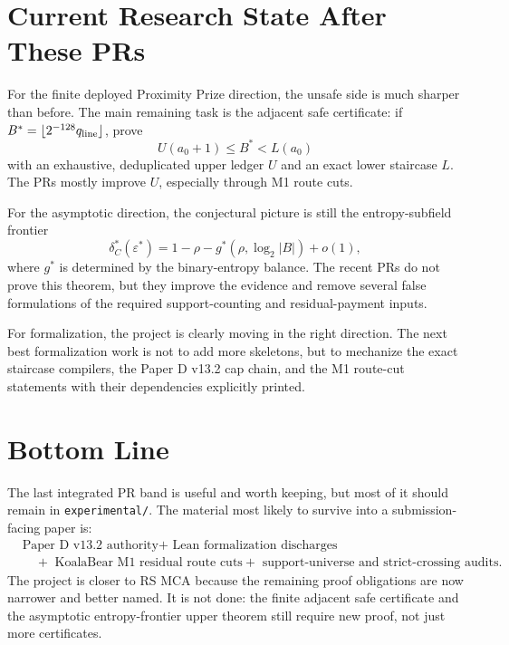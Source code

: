 \documentclass[a4paper,11pt]{amsart}
\begin{document}
\section{Current Research State After These PRs}

For the finite deployed Proximity Prize direction, the unsafe side is much
sharper than before.  The main remaining task is the adjacent safe certificate:
if \(B^*=\lfloor 2^{-128}q_{\rm line}\rfloor\), prove
\[
        U(a_0+1)\le B^* < L(a_0)
\]
with an exhaustive, deduplicated upper ledger \(U\) and an exact lower
staircase \(L\).  The PRs mostly improve \(U\), especially through M1 route
cuts.

For the asymptotic direction, the conjectural picture is still the
entropy-subfield frontier
\[
        \delta_C^*(\varepsilon^*)
        =
        1-\rho-g^*(\rho,\log_2 |B|)+o(1),
\]
where \(g^*\) is determined by the binary-entropy balance.  The recent PRs do
not prove this theorem, but they improve the evidence and remove several false
formulations of the required support-counting and residual-payment inputs.

For formalization, the project is clearly moving in the right direction.  The
next best formalization work is not to add more skeletons, but to mechanize
the exact staircase compilers, the Paper D v13.2 cap chain, and the M1
route-cut statements with their dependencies explicitly printed.

\section{Bottom Line}

The last integrated PR band is useful and worth keeping, but most of it should
remain in \texttt{experimental/}.  The material most likely to survive into a
submission-facing paper is:
\[
\begin{aligned}
&\text{Paper D v13.2 authority}
+\text{ Lean formalization discharges}\\
&\quad+\text{ KoalaBear M1 residual route cuts}
+\text{ support-universe and strict-crossing audits}.
\end{aligned}
\]
The project is closer to RS MCA because the remaining proof obligations are
now narrower and better named.  It is not done: the finite adjacent safe
certificate and the asymptotic entropy-frontier upper theorem still require
new proof, not just more certificates.
\end{document}
